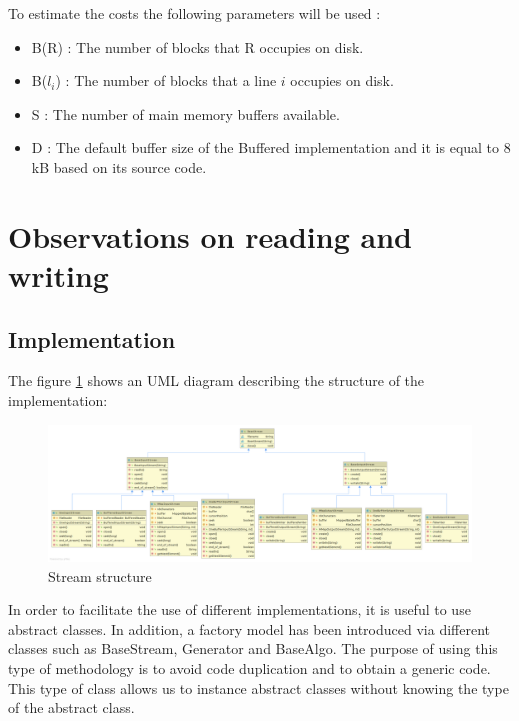 \documentclass[12pt]{article}
\begin{document}
To estimate the costs the following parameters will be used :
\begin{itemize}
    \item B(R) : The number of blocks that R occupies on disk.
    \item B($l_i$) : The number of blocks that a line $i$ occupies on disk.
    \item S : The number of main memory buffers available.
    \item D : The default buffer size of the Buffered implementation and it is equal to 8 kB based on its source code. 
\end{itemize}
\section{Observations on reading and writing}
\subsection{Implementation}

The figure \ref{fig:1} shows an UML diagram describing the structure of the implementation:

\begin{figure}[H] 
\begin{adjustwidth}{-3cm}{-1cm}
 \begin{center}
\includegraphics[width=20cm]{images/Stream.png}
\end{center}
\caption{Stream structure}
\label{fig:1}
\end{adjustwidth}
\end{figure}

In order to facilitate the use of different implementations, it is useful to use abstract classes. In addition, a factory model has been introduced via different classes such as BaseStream, Generator and BaseAlgo. The purpose of using this type of methodology is to avoid code duplication and to obtain a generic code. This type of class allows us to instance abstract classes without knowing the type of the abstract class.
\end{document}

